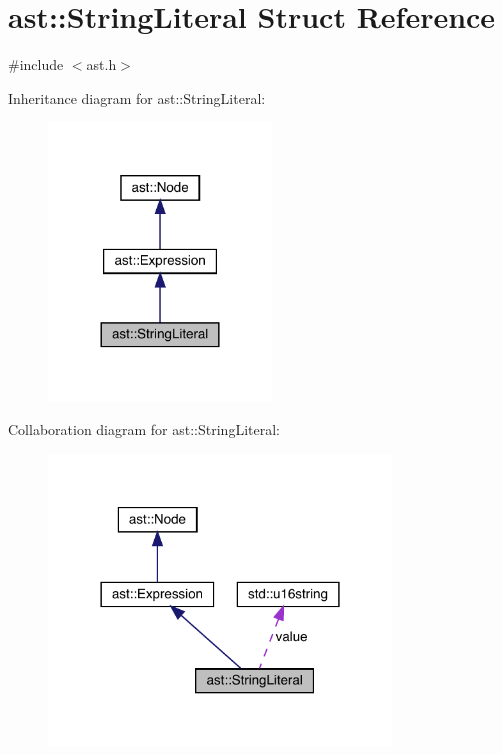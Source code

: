 \hypertarget{structast_1_1_string_literal}{}\section{ast\+:\+:String\+Literal Struct Reference}
\label{structast_1_1_string_literal}


{\ttfamily \#include $<$ast.\+h$>$}



Inheritance diagram for ast\+:\+:String\+Literal\+:
\nopagebreak
\begin{figure}[H]
\begin{center}
\leavevmode
\includegraphics[width=168pt]{structast_1_1_string_literal__inherit__graph}
\end{center}
\end{figure}


Collaboration diagram for ast\+:\+:String\+Literal\+:
\nopagebreak
\begin{figure}[H]
\begin{center}
\leavevmode
\includegraphics[width=258pt]{structast_1_1_string_literal__coll__graph}
\end{center}
\end{figure}

